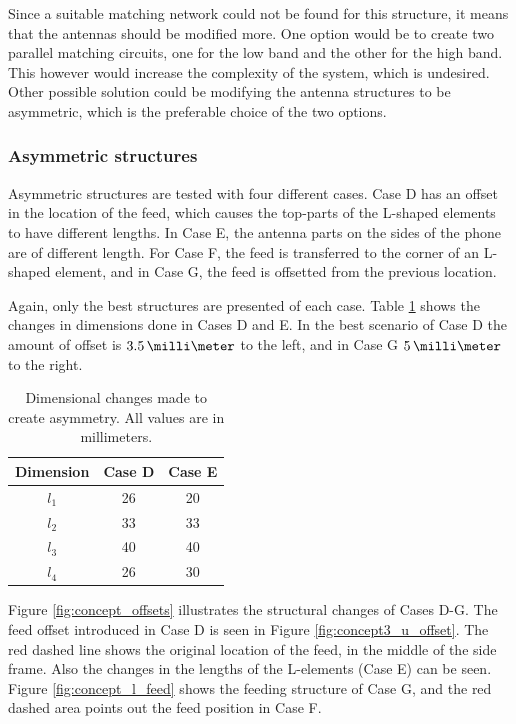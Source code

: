 Since a suitable matching network could not be found for this structure, it means that the antennas should be modified more. One option would be to create two parallel matching circuits, one for the low band and the other for the high band. This however would increase the complexity of the system, which is undesired. Other possible solution could be modifying the antenna structures to be asymmetric, which is the preferable choice of the two options.

\vspace{-5pt}
\subsubsection{Asymmetric structures}
\label{sec:asymmetric_structures}
\vspace{-3pt}
Asymmetric structures are tested with four different cases. Case D has an offset in the location of the feed, which causes the top-parts of the L-shaped elements to have different lengths. In Case E, the antenna parts on the sides of the phone are of different length. For Case F, the feed is transferred to the corner of an L-shaped element, and in Case G, the feed is offsetted from the previous location.

Again, only the best structures are presented of each case. Table \ref{tab:concept3} shows the changes in dimensions done in Cases D and E. In the best scenario of Case D the amount of offset is $3.5\,\milli\meter$ to the left, and in Case G $5\,\milli\meter$ to the right. 
\begin{table}[H]
    \vspace{-5pt}
    \centering
    \caption{Dimensional changes made to create asymmetry. All values are in millimeters.}
    \label{tab:concept3}
    \vspace{-7pt}
    \begin{tabular}{|c|c|c|}
        \hline
        \textbf{Dimension} & \textbf{Case D} & \textbf{Case E}\\
        \hline
        $l_1$ & 26 & 20 \\
        \hline
        $l_2$ & 33 & 33\\
        \hline
        $l_3$ & 40 & 40\\
        \hline
        $l_4$ & 26 & 30\\
        \hline
    \end{tabular}
\end{table}

Figure \ref{fig:concept_offsets} illustrates the structural changes of Cases D-G. The feed offset introduced in Case D is seen in Figure \ref{fig:concept3_u_offset}. The red dashed line shows the original location of the feed, in the middle of the side frame. Also the changes in the lengths of the L-elements (Case E) can be seen. Figure \ref{fig:concept_l_feed} shows the feeding structure of Case G, and the red dashed area points out the feed position in Case F.

